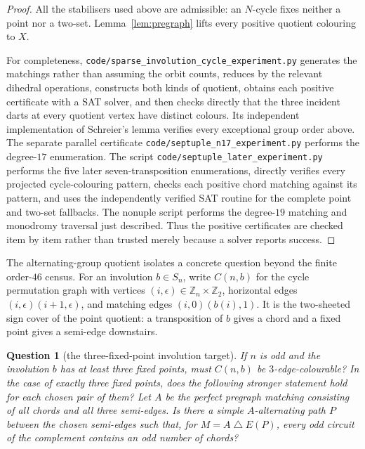 \documentclass[11pt,a4paper]{article}
\newtheorem{question}[theorem]{Question}
\theoremstyle{definition}
\theoremstyle{remark}
\begin{document}
\begin{proof}
All the stabilisers used above are admissible: an $N$-cycle fixes neither a point nor a two-set.  Lemma~\ref{lem:pregraph} lifts every positive quotient colouring to $X$.

For completeness, \nolinkurl{code/sparse_involution_cycle_experiment.py} generates the matchings rather than assuming the orbit counts, reduces by the relevant dihedral operations, constructs both kinds of quotient, obtains each positive certificate with a SAT solver, and then checks directly that the three incident darts at every quotient vertex have distinct colours.  Its independent implementation of Schreier's lemma verifies every exceptional group order above.  The separate parallel certificate \nolinkurl{code/septuple_n17_experiment.py} performs the degree-$17$ enumeration.  The script \nolinkurl{code/septuple_later_experiment.py} performs the five later seven-transposition enumerations, directly verifies every projected cycle-colouring pattern, checks each positive chord matching against its pattern, and uses the independently verified SAT routine for the complete point and two-set fallbacks.  The nonuple script performs the degree-$19$ matching and monodromy traversal just described.  Thus the positive certificates are checked item by item rather than trusted merely because a solver reports success.
\end{proof}

The alternating-group quotient isolates a concrete question beyond the finite order-$46$ census.  For an involution $b\in S_n$, write $C(n,b)$ for the cycle permutation graph with vertices $(i,\epsilon)\in\mathbb Z_n\times\mathbb Z_2$, horizontal edges $(i,\epsilon)(i+1,\epsilon)$, and matching edges $(i,0)(b(i),1)$.  It is the two-sheeted sign cover of the point quotient: a transposition of $b$ gives a chord and a fixed point gives a semi-edge downstairs.

\begin{question}[the three-fixed-point involution target]\label{q:three-semiedge-path}
If $n$ is odd and the involution $b$ has at least three fixed points, must $C(n,b)$ be $3$-edge-colourable?  In the case of exactly three fixed points, does the following stronger statement hold for each chosen pair of them?  Let $A$ be the perfect pregraph matching consisting of all chords and all three semi-edges.  Is there a simple $A$-alternating path $P$ between the chosen semi-edges such that, for $M=A\mathbin\triangle E(P)$, every odd circuit of the complement contains an odd number of chords?
\end{question}
\end{document}
